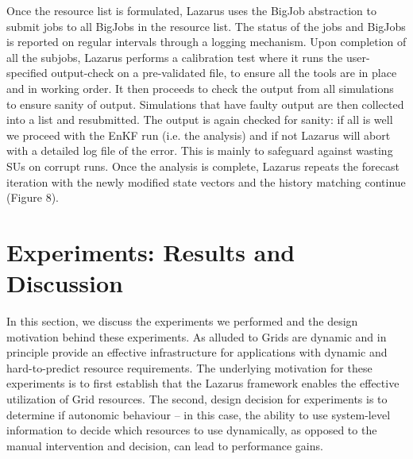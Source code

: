 \documentclass{sig-alternate}
\begin{document}
Once the resource list is formulated, Lazarus uses the BigJob
abstraction to submit jobs to all BigJobs in the resource list. The
status of the jobs and BigJobs is reported on regular intervals
through a logging mechanism. Upon completion of all the subjobs,
Lazarus performs a calibration test where it runs the user-specified
output-check on a pre-validated file, to ensure all the tools are in
place and in working order. It then proceeds to check the output from
all simulations to ensure sanity of output. Simulations that have
faulty output are then collected into a list and resubmitted. The
output is again checked for sanity: if all is well we proceed with the
EnKF run (i.e. the analysis) and if not Lazarus will abort with a
detailed log file of the error. This is mainly to safeguard against
wasting SUs on corrupt runs. Once the analysis is complete, Lazarus
repeats the forecast iteration with the newly modified state vectors
and the history matching continue (Figure 8).


\section{Experiments: Results and Discussion}

In this section, we discuss the experiments we performed and the
design motivation behind these experiments.  As alluded to Grids are
dynamic and in principle provide an effective infrastructure for
applications with dynamic and hard-to-predict resource requirements.
The underlying motivation for these experiments is to first establish
that the Lazarus framework enables the effective utilization of Grid
resources. The second, design decision for experiments is to determine
if autonomic behaviour -- in this case, the ability to use
system-level information to decide which resources to use dynamically,
as opposed to the manual intervention and decision, can lead to
performance gains.
\end{document}
